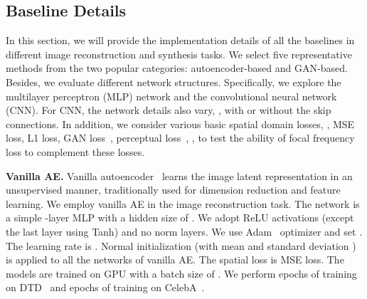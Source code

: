 \documentclass[10pt,twocolumn,letterpaper]{article}
\begin{document}
\subsection{Baseline Details}
\label{sec:baselinedetails}
In this section, we will provide the implementation details of all the baselines in different image reconstruction and synthesis tasks.
We select five representative methods from the two popular categories: autoencoder-based and GAN-based.
Besides, we evaluate different network structures. Specifically, we explore the multilayer perceptron (MLP) network and the convolutional neural network (CNN). For CNN, the network details also vary, \eg, with or without the skip connections.
In addition, we consider various basic spatial domain losses, \eg, MSE loss, L1 loss, GAN loss~\cite{GAN}, perceptual loss~\cite{perceptualloss}, \etc, to test the ability of focal frequency loss to complement these losses.





\vspace{0.05cm}
\noindent
\textbf{Vanilla AE.}
Vanilla autoencoder~\cite{ae} learns the image latent representation in an unsupervised manner, traditionally used for dimension reduction and feature learning.
We employ vanilla AE in the image reconstruction task.
The network is a simple -layer MLP with a hidden size of . We adopt ReLU activations (except the last layer using Tanh) and no norm layers.
We use Adam~\cite{adam} optimizer and set . The learning rate is . Normal initialization (with mean  and standard deviation ) is applied to all the networks of vanilla AE.
The spatial loss is MSE loss.
The models are trained on  GPU with a batch size of .
We perform  epochs of training on DTD~\cite{DTD} and  epochs of training on CelebA~\cite{celeba}.
\end{document}
